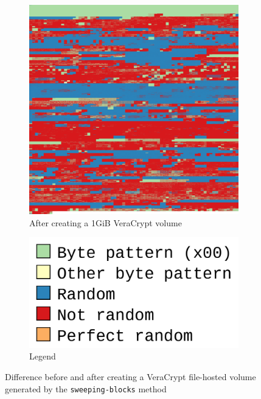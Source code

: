 \documentclass[
  digital, %
  color,   %
  oneside, %
  lof,     %
  nolot,     %
]{fithesis4}
\begin{document}
\begin{figure}
\begin{subfigure}[t]{.45\textwidth}
    \includegraphics[width=\textwidth,interpolate=false]{ubnt-veracrypt-chi2-4-sweeping-blocks.png}
    \caption{After creating a 1GiB VeraCrypt volume}
    \label{fig:veracrypt-with}
  \end{subfigure}
  \begin{subfigure}[b]{.45\textwidth}
    \centering
    \includegraphics[width=\textwidth]{legend.png}
    \caption{Legend}
    \label{fig:veracrypt-legend} 
  \end{subfigure}
  \caption{Difference before and after creating a VeraCrypt file-hosted volume generated by the  \texttt{sweeping-blocks} method}
  \label{fig:veracrypt}
\end{figure}
\end{document}
